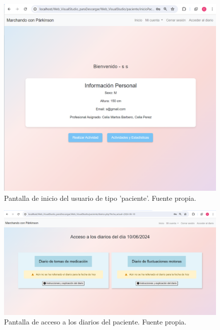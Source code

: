 \begin{figure}[h]
    \centering
    \includegraphics[width=1\textwidth]{img/iniciopaciente.png}
    \caption{Pantalla de inicio del usuario de tipo 'paciente'. Fuente propia.}
    \label{fig:iniciopaciente}
\end{figure}

\begin{figure}[h]
    \centering
    \includegraphics[width=1\textwidth]{img/diarios.png}
    \caption{Pantalla de acceso a los diarios del paciente. Fuente propia.}
    \label{fig:diarios}
\end{figure}

